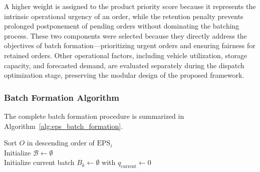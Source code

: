 \documentclass{article}
\begin{document}
A higher weight is assigned to the product priority score because it represents the intrinsic operational urgency of an order, while the retention penalty prevents prolonged postponement of pending orders without dominating the batching process. These two components were selected because they directly address the objectives of batch formation---prioritizing urgent orders and ensuring fairness for retained orders. Other operational factors, including vehicle utilization, storage capacity, and forecasted demand, are evaluated separately during the dispatch optimization stage, preserving the modular design of the proposed framework.

\subsubsection{Batch Formation Algorithm}
\label{subsubsec:batch_formation_algorithm}

The complete batch formation procedure is summarized in Algorithm~\ref{alg:eps_batch_formation}.

\begin{algorithm}[htbp]


\BlankLine
{}
Sort $O$ in descending order of $\mathrm{EPS}_i$\;\\

Initialize $\mathcal{B} \leftarrow \emptyset$\;\\
Initialize current batch $B_k \leftarrow \emptyset$ with $q_{\mathrm{current}} \leftarrow 0$\;\\



\;
\caption{EPS-Based Batch Formation}
\label{alg:eps_batch_formation}
\end{algorithm}
\end{document}
